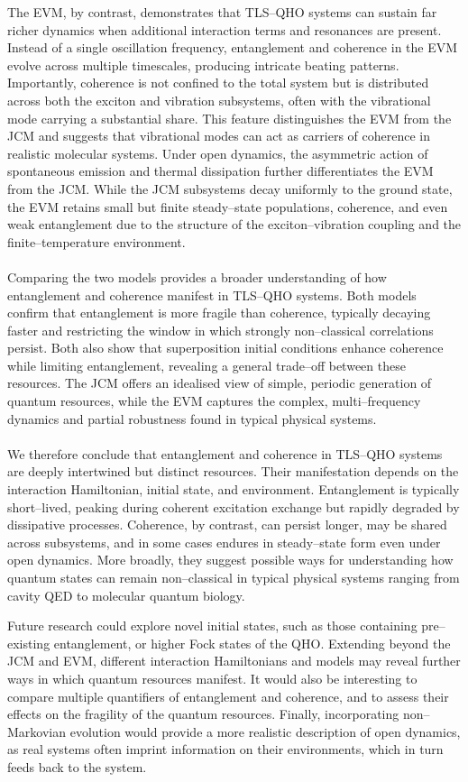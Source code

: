 \documentclass[11pt]{article}
\begin{document}
The EVM, by contrast, demonstrates that TLS--QHO systems can sustain far richer dynamics when additional interaction terms and resonances are present. Instead of a single oscillation frequency, entanglement and coherence in the EVM evolve across multiple timescales, producing intricate beating patterns. Importantly, coherence is not confined to the total system but is distributed across both the exciton and vibration subsystems, often with the vibrational mode carrying a substantial share. This feature distinguishes the EVM from the JCM and suggests that vibrational modes can act as carriers of coherence in realistic molecular systems. Under open dynamics, the asymmetric action of spontaneous emission and thermal dissipation further differentiates the EVM from the JCM. While the JCM subsystems decay uniformly to the ground state, the EVM retains small but finite steady–state populations, coherence, and even weak entanglement due to the structure of the exciton--vibration coupling and the finite–temperature environment.\\
\\
Comparing the two models provides a broader understanding of how entanglement and coherence manifest in TLS--QHO systems. Both models confirm that entanglement is more fragile than coherence, typically decaying faster and restricting the window in which strongly non--classical correlations persist. Both also show that superposition initial conditions enhance coherence while limiting entanglement, revealing a general trade--off between these resources. The JCM offers an idealised view of simple, periodic generation of quantum resources, while the EVM captures the complex, multi--frequency dynamics and partial robustness found in typical physical systems.\\
\\
We therefore conclude that entanglement and coherence in TLS--QHO systems are deeply intertwined but distinct resources. Their manifestation depends on the interaction Hamiltonian, initial state, and environment. Entanglement is typically short–lived, peaking during coherent excitation exchange but rapidly degraded by dissipative processes. Coherence, by contrast, can persist longer, may be shared across subsystems, and in some cases endures in steady--state form even under open dynamics. More broadly, they suggest possible ways for understanding how quantum states can remain non--classical in typical physical systems ranging from cavity QED to molecular quantum biology.

Future research could explore novel initial states, such as those containing pre--existing entanglement, or higher Fock states of the QHO. Extending beyond the JCM and EVM, different interaction Hamiltonians and models may reveal further ways in which quantum resources manifest. It would also be interesting to compare multiple quantifiers of entanglement and coherence, and to assess their effects on the fragility of the quantum resources. Finally, incorporating non--Markovian evolution would provide a more realistic description of open dynamics, as real systems often imprint information on their environments, which in turn feeds back to the system.

\newpage
{}
 
 
\end{document}
